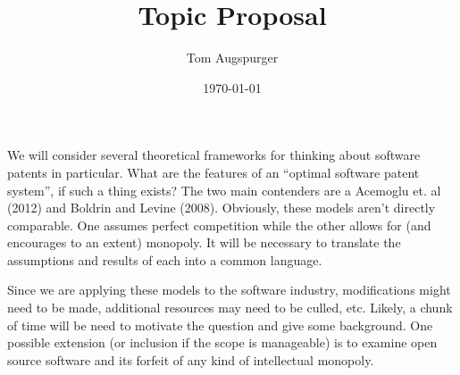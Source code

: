 \documentclass[11pt]{article}
\title{Topic Proposal}
\author{Tom Augspurger}
\date{\today}
\begin{document}
\maketitle

We will consider several theoretical frameworks for thinking about software patents in particular.  What are the features of an ``optimal software patent system'', if such a thing exists? The two main contenders are a Acemoglu et. al (2012) and Boldrin and Levine (2008).  Obviously, these models aren't directly comparable.  One assumes perfect competition while the other allows for (and encourages to an extent) monopoly. It will be necessary to translate the assumptions and results of each into a common language.  

Since we are applying these models to the software industry, modifications might need to be made, additional resources may need to be culled, etc.  Likely, a chunk of time will be need to motivate the question and give some background.  One possible extension (or inclusion if the scope is manageable) is to examine open source software and its forfeit of any kind of intellectual monopoly.
\end{document}
